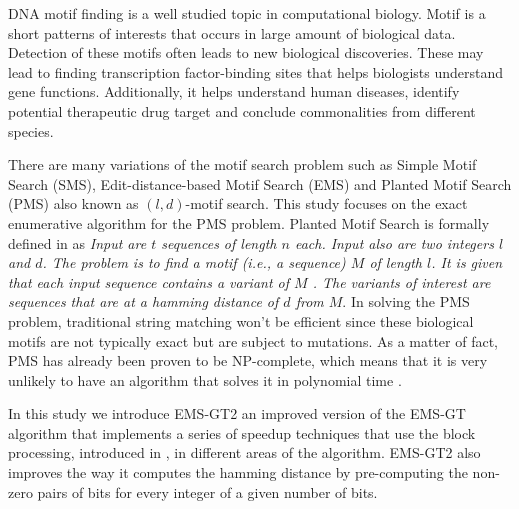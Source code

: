 
DNA motif finding is a well studied topic in computational biology. Motif is a short patterns of interests that occurs in large amount of biological data. Detection of these motifs often leads to new biological discoveries. These may lead to finding transcription factor-binding sites that helps biologists understand gene functions. Additionally, it helps understand human diseases, identify potential therapeutic drug target and conclude commonalities from different species.

There are many variations of the motif search problem such as Simple Motif Search (SMS), Edit-distance-based Motif Search (EMS) and Planted Motif Search (PMS) also known as $(l, d)$-motif search. This study focuses on the exact enumerative algorithm for the PMS problem. Planted Motif Search is formally defined in \cite{ExactAlgorithmsPMS} as \emph{Input are $t$ sequences of length $n$ each. Input also are two integers $l$ and $d$. The problem is to find a motif (i.e., a sequence) $M$ of length $l$. It is given that each input sequence contains a variant of $M$ . The variants of interest are sequences that are at a hamming distance of $d$ from $M$}. In solving the PMS problem, traditional string matching won't be efficient since these biological motifs are not typically exact but are subject to mutations. As a matter of fact, PMS has already been proven to be NP-complete, which means that it is very unlikely to have an algorithm that solves it in polynomial time \cite{Evans2003407}.

In this study we introduce EMS-GT2 an improved version of the EMS-GT algorithm that implements a series of speedup techniques that use the block processing, introduced in \cite{sia2015}, in different areas of the algorithm. EMS-GT2 also improves the way it computes the hamming distance by pre-computing the non-zero pairs of bits for every integer of a given number of bits.
